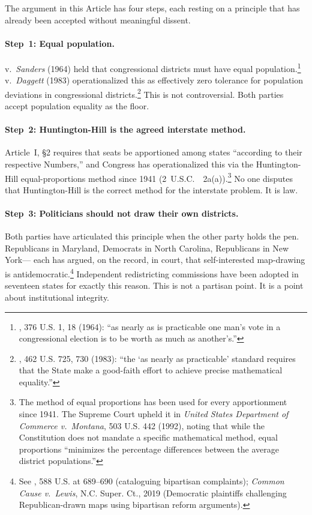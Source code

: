 The argument in this Article has four steps, each resting on a principle
that has already been accepted without meaningful dissent.

\paragraph{Step~1: Equal population.}
\wesberry{} v.\ \textit{Sanders} (1964) held that congressional districts
must have equal population.\footnote{%
  \wesberry{}, 376 U.S. 1, 18 (1964): ``as nearly as is practicable one man's
  vote in a congressional election is to be worth as much as another's.''
}
\karcher{} v.\ \textit{Daggett} (1983) operationalized this as effectively
zero tolerance for population deviations in congressional districts.\footnote{%
  \karcher{}, 462 U.S. 725, 730 (1983): ``the `as nearly as practicable'
  standard requires that the State make a good-faith effort to achieve precise
  mathematical equality.''
}
This is not controversial.
Both parties accept population equality as the floor.

\paragraph{Step~2: Huntington-Hill is the agreed interstate method.}
Article~I, \S2 requires that seats be apportioned among states
``according to their respective Numbers,'' and Congress has operationalized
this via the Huntington-Hill equal-proportions method since 1941
(2~U.S.C.~\usca{}~2a(a)).\footnote{%
  The method of equal proportions has been used for every apportionment since
  1941.
  The Supreme Court upheld it in \textit{United States Department of Commerce
  v.\ Montana}, 503 U.S. 442 (1992), noting that while the Constitution does
  not mandate a specific mathematical method, equal proportions ``minimizes
  the percentage differences between the average district populations.''
}
No one disputes that Huntington-Hill is the correct method for the interstate
problem.
It is law.

\paragraph{Step~3: Politicians should not draw their own districts.}
Both parties have articulated this principle when the other party holds the pen.
Republicans in Maryland, Democrats in North Carolina, Republicans in New York---
each has argued, on the record, in court, that self-interested map-drawing
is antidemocratic.\footnote{%
  See \rucho{}, 588 U.S. at 689--690 (cataloguing bipartisan complaints);
  \textit{Common Cause v.\ Lewis}, N.C. Super. Ct., 2019 (Democratic plaintiffs
  challenging Republican-drawn maps using bipartisan reform arguments).
}
Independent redistricting commissions have been adopted in seventeen states
for exactly this reason.
This is not a partisan point.
It is a point about institutional integrity.

